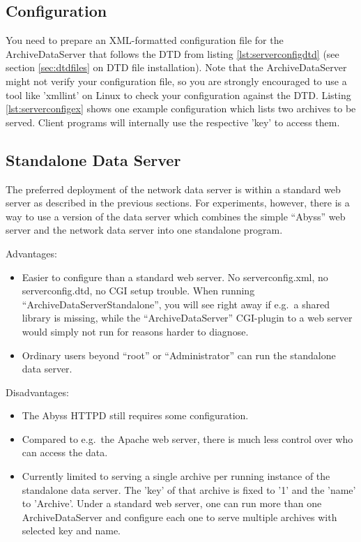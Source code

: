 \subsection{Configuration}  %
You need to prepare an XML-formatted configuration file for the
ArchiveDataServer that follows the DTD from listing
\ref{lst:serverconfigdtd} (see section \ref{sec:dtdfiles} on DTD file
installation). Note that the ArchiveDataServer might not verify your
configuration file, so you are strongly encouraged to use a tool like
'xmllint' on Linux to check your configuration against the
DTD. Listing \ref{lst:serverconfigex} shows one example configuration
which lists two archives to be served. Client programs will internally
use the respective 'key' to access them.




\clearpage

\subsection{Standalone Data Server} %
The preferred deployment of the network data server is within a
standard web server as described in the previous sections.
For experiments, however, there is a way to use a version of the 
data server which combines the simple ``Abyss''
web server and the network data server into one standalone program.

\noindent Advantages:
\begin{itemize}
\item Easier to configure than a standard web server. No
  serverconfig.xml, no serverconfig.dtd, no CGI setup trouble. When running
  ``ArchiveDataServerStandalone'', you will see right away if e.g.\ a
  shared library is missing, while the ``ArchiveDataServer''
  CGI-plugin to a web server would simply not run for reasons harder
  to diagnose.
\item Ordinary users beyond ``root'' or ``Administrator''
  can run the standalone data server.
\end{itemize}

\noindent Disadvantages:
\begin{itemize}
\item The Abyss HTTPD still requires some configuration.
\item Compared to e.g.\ the Apache web server, there is much less
  control over who can access the data.
\item Currently limited to serving a single archive per running
  instance of the standalone data server.
  The 'key' of that archive is fixed to '1' and  the 'name' to 'Archive'.
  Under a standard web server, one can run more than one
  ArchiveDataServer and configure each one to serve multiple archives
  with selected key and name.
\end{itemize}

